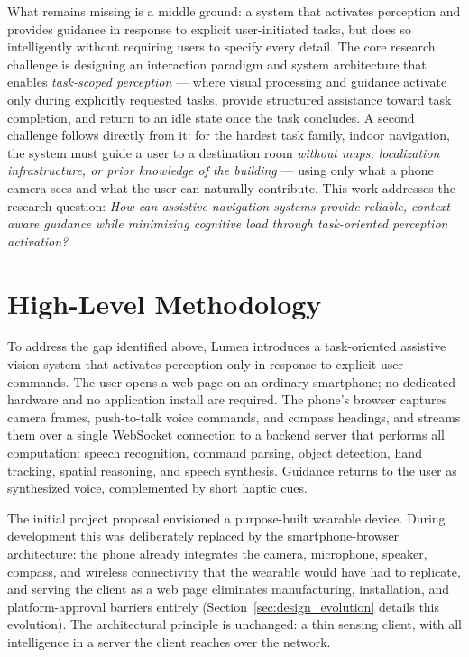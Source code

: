 What remains missing is a middle ground: a system that activates perception and
provides guidance in response to explicit user-initiated tasks, but does so
intelligently without requiring users to specify every detail. The core research
challenge is designing an interaction paradigm and system architecture that enables
\emph{task-scoped perception} --- where visual processing and guidance activate only
during explicitly requested tasks, provide structured assistance toward task
completion, and return to an idle state once the task concludes. A second challenge
follows directly from it: for the hardest task family, indoor navigation, the system
must guide a user to a destination room \emph{without maps, localization
infrastructure, or prior knowledge of the building} --- using only what a phone
camera sees and what the user can naturally contribute. This work addresses the
research question: \textit{How can assistive navigation systems provide reliable,
context-aware guidance while minimizing cognitive load through task-oriented
perception activation?}

\section{High-Level Methodology}
\label{sec:high_level_methodology}

To address the gap identified above, Lumen introduces a task-oriented assistive
vision system that activates perception only in response to explicit user commands.
The user opens a web page on an ordinary smartphone; no dedicated hardware and no
application install are required. The phone's browser captures camera frames,
push-to-talk voice commands, and compass headings, and streams them over a single
WebSocket connection to a backend server that performs all computation: speech
recognition, command parsing, object detection, hand tracking, spatial reasoning, and
speech synthesis. Guidance returns to the user as synthesized voice, complemented by
short haptic cues.

The initial project proposal envisioned a purpose-built wearable device. During
development this was deliberately replaced by the smartphone-browser architecture:
the phone already integrates the camera, microphone, speaker, compass, and wireless
connectivity that the wearable would have had to replicate, and serving the client as
a web page eliminates manufacturing, installation, and platform-approval barriers
entirely (Section~\ref{sec:design_evolution} details this evolution). The
architectural principle is unchanged: a thin sensing client, with all intelligence in
a server the client reaches over the network.

